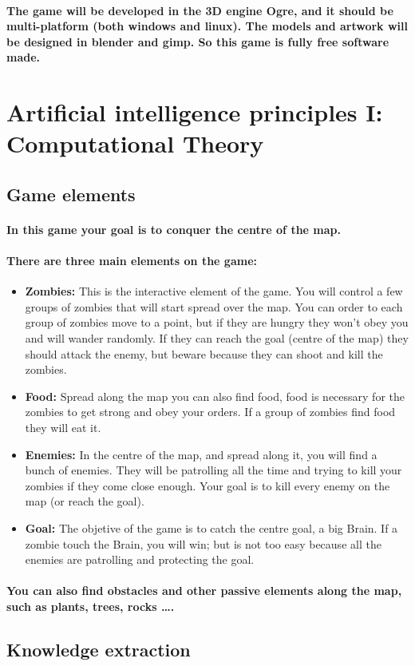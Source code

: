 \documentclass[a4paper,10pt]{article}
\newcommand{\p}[1]{\paragraph{\indent\textnormal{#1}}}
\begin{document}
    \p{The game will be developed in the 3D engine  Ogre, and it should be multi-platform (both windows and linux). The models and artwork will be designed in blender and gimp. So this game is fully free software made.}
    

\newpage
\section{Artificial intelligence principles I: Computational Theory}

  \subsection{Game elements}

    \p{In this game your goal is to conquer the centre of the map.}

    \p{There are three main elements on the game:}

    \begin{itemize}
     \item \textbf{Zombies:} This is the interactive element of the game. You will control a few groups of zombies that will start spread over the map. You can order to each group of zombies move to a point, but if they are hungry they won't obey you and will wander randomly. If they can reach the goal (centre of the map) they should attack the enemy, but beware because they can shoot and kill the zombies.
     \item \textbf{Food:} Spread along the map you can also find food, food is necessary for the zombies to get strong and obey your orders. If a group of zombies find food they will eat it.
     \item \textbf{Enemies:} In the centre of the map, and spread along it, you will find a bunch of enemies. They will be patrolling all the time and trying to kill your zombies if they come close enough. Your goal is to kill every enemy on the map (or reach the goal).
     \item \textbf{Goal:} The objetive of the game is to catch the centre goal, a big Brain. If a zombie touch the Brain, you will win; but is not too easy because all the enemies are patrolling and protecting the goal.
    \end{itemize}

  \p{You can also find obstacles and other passive elements along the map, such as plants, trees, rocks \dots.}


  \subsection{Knowledge extraction}
\end{document}
